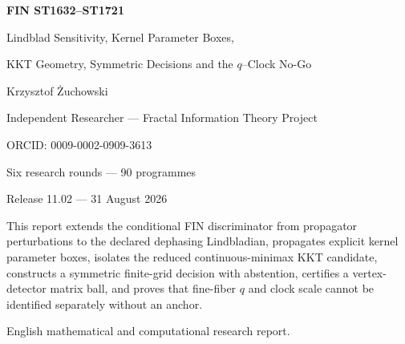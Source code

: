 \documentclass[11pt,a4paper]{article}
\begin{document}
\begin{titlepage}\centering\vspace*{14mm}
{\Huge\bfseries FIN ST1632--ST1721\par}\vspace{4mm}
{\LARGE Lindblad Sensitivity, Kernel Parameter Boxes,\par}\vspace{2mm}
{\LARGE KKT Geometry, Symmetric Decisions and the $q$--Clock No-Go\par}\vspace{12mm}
{\Large Krzysztof \.Zuchowski\par}
{\normalsize Independent Researcher --- Fractal Information Theory Project\par}
{\normalsize ORCID: 0009-0002-0909-3613\par}\vspace{9mm}
{\large Six research rounds --- 90 programmes\par}
{\large Release 11.02 --- 31 August 2026\par}
\vfill
\begin{minipage}{.87\textwidth}\small
This report extends the conditional FIN discriminator from propagator
perturbations to the declared dephasing Lindbladian, propagates explicit kernel
parameter boxes, isolates the reduced continuous-minimax KKT candidate,
constructs a symmetric finite-grid decision with abstention, certifies a
vertex-detector matrix ball, and proves that fine-fiber $q$ and clock scale
cannot be identified separately without an anchor.
\end{minipage}\vfill
{\small English mathematical and computational research report.}
\end{titlepage}
\end{document}
